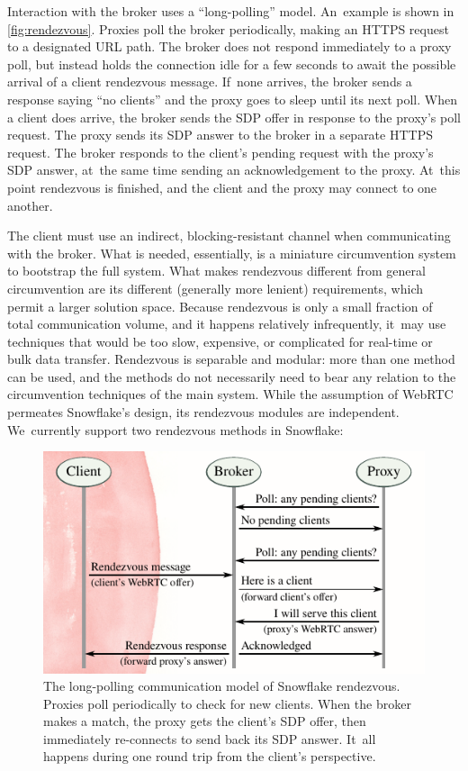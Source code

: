 \documentclass[letterpaper,twocolumn]{article}
\begin{document}
Interaction with the broker uses a ``long-polling'' model.
An~example is shown in \autoref{fig:rendezvous}.
Proxies poll the broker periodically,
making an HTTPS request to a designated URL path.
The broker does not respond immediately to a proxy poll,
but instead holds the connection idle for a few seconds
to await the possible arrival of a client rendezvous message.
If~none arrives, the broker sends a response saying ``no clients''
and the proxy goes to sleep until its next poll.
When a client does arrive,
the broker sends the SDP offer in response
to the proxy's poll request.
The proxy sends its SDP answer to the broker
in a separate HTTPS request.
The broker responds to the client's pending request
with the proxy's SDP answer,
at~the same time sending an acknowledgement to the proxy.
At~this point rendezvous is finished,
and the client and the proxy may connect to one another.

The client must use an indirect,
blocking-resistant channel
when communicating with the broker.
What is needed, essentially,
is a miniature circumvention system
to bootstrap the full system.
What makes rendezvous
different from general circumvention
are its different (generally more lenient) requirements,
which permit a larger solution space.
Because rendezvous is only a small fraction
of total communication volume,
and it happens relatively infrequently,
it~may use techniques that would be
too slow, expensive, or complicated
for real-time or bulk data transfer.
Rendezvous is separable and modular:
more than one method can be used,
and the methods do not necessarily need to bear any relation
to the circumvention techniques of the main system.
While the assumption of WebRTC permeates Snowflake's design,
its rendezvous modules are independent.
We~currently support two rendezvous methods in Snowflake:

\begin{figure}
\includegraphics{figures/rendezvous/rendezvous}
\caption{
The long-polling communication model of Snowflake rendezvous.
Proxies poll periodically to check for new clients.
When the broker makes a match,
the proxy gets the client's SDP offer,
then immediately re-connects to send back its SDP answer.
It~all happens during one round trip from the client's perspective.
}
\label{fig:rendezvous}
\end{figure}
\end{document}
